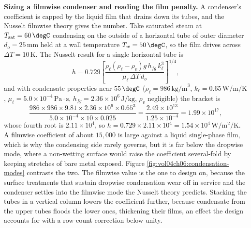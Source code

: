 \textbf{Sizing a filmwise condenser and reading the film penalty.} A condenser's
coefficient is capped by the liquid film that drains down its tubes, and the
Nusselt filmwise theory gives the number. Take saturated steam at $T_{\text{sat}}
= 60\,\degC$ condensing on the outside of a horizontal tube of outer diameter
$d_o = 25\,\si{\milli\meter}$ held at a wall temperature $T_w = 50\,\degC$, so the
film drives across $\Delta T = 10\,\si{\kelvin}$. The Nusselt result for a single
horizontal tube is
\[
h = 0.729\left[\frac{\rho_\ell(\rho_\ell - \rho_v) g\, h_{fg}\, k_\ell^3}
{\mu_\ell\,\Delta T\, d_o}\right]^{1/4},
\]
and with condensate properties near $55\,\degC$ ($\rho_\ell = 986\,\text{kg/m}^3$,
$k_\ell = 0.65\,\si{\watt\per\meter\per\kelvin}$, $\mu_\ell = 5.0\times 10^{-4}\,
\text{Pa}\cdot\text{s}$, $h_{fg} = 2.36\times 10^6\,\text{J/kg}$, $\rho_v$
negligible) the bracket is
\[
\frac{986\times 986\times 9.81\times 2.36\times 10^6\times 0.65^3}
{5.0\times 10^{-4}\times 10\times 0.025} = \frac{2.49\times 10^{13}}
{1.25\times 10^{-4}} = 1.99\times 10^{17},
\]
whose fourth root is $2.11\times 10^4$, so $h = 0.729\times 2.11\times 10^4 =
1.54\times 10^4\,\si{\watt\per\meter\squared\per\kelvin}$. A filmwise coefficient
of about $15{,}000$ is large against a liquid single-phase film, which is why the
condensing side rarely governs, but it is far below the dropwise mode, where a
non-wetting surface would raise the coefficient several-fold by keeping stretches
of bare metal exposed. Figure \ref{fig:vol04ch06:condensation-modes} contrasts the
two. The filmwise value is the one to design on, because the surface treatments
that sustain dropwise condensation wear off in service and the condenser settles
into the filmwise mode the Nusselt theory predicts. Stacking the tubes in a
vertical column lowers the coefficient further, because condensate from the upper
tubes floods the lower ones, thickening their films, an effect the design accounts
for with a row-count correction below unity.

